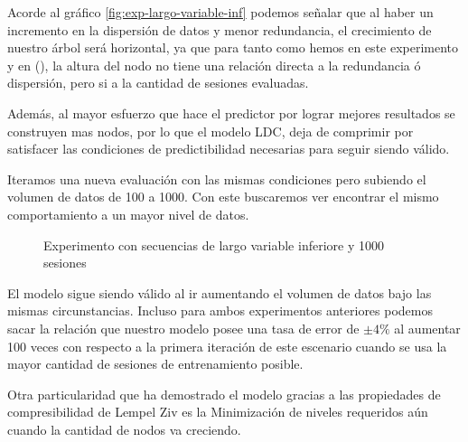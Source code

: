 	
	



	Acorde al gráfico \ref{fig:exp-largo-variable-inf} podemos señalar que al haber un incremento en la dispersión de datos y menor redundancia, el crecimiento de nuestro árbol será horizontal, ya que para tanto como hemos en este experimento y en (\label{expResult2}), la altura del nodo no tiene una relación directa a la redundancia ó dispersión, pero si a la cantidad de sesiones evaluadas. 
	
	Además, al mayor esfuerzo que hace el predictor por lograr mejores resultados se construyen mas nodos, por lo que el modelo LDC, deja de comprimir por satisfacer las condiciones de predictibilidad necesarias para seguir siendo válido.

	
	Iteramos una nueva evaluación con las mismas condiciones pero subiendo el volumen de datos de 100 a 1000. Con este buscaremos ver encontrar el mismo comportamiento a un mayor nivel de datos.
	


	
	
	\begin{figure}[t] 
		\centering
		\caption{Experimento con secuencias de largo variable inferiore y 1000 sesiones}
		\label{fig:sim}
	\end{figure}
	
	El modelo sigue siendo válido al ir aumentando el volumen de datos bajo las mismas circunstancias. Incluso para ambos experimentos anteriores podemos sacar la relación que nuestro modelo posee una tasa de error de $\pm4\%$ al aumentar 100 veces con respecto a la primera iteración de este escenario cuando se usa la  mayor cantidad de sesiones de entrenamiento posible.


	Otra particularidad que ha demostrado el modelo gracias a las propiedades de compresibilidad de Lempel Ziv\cite{ZivLempel1977} es la Minimización de niveles requeridos aún cuando la cantidad de nodos va creciendo.
	
